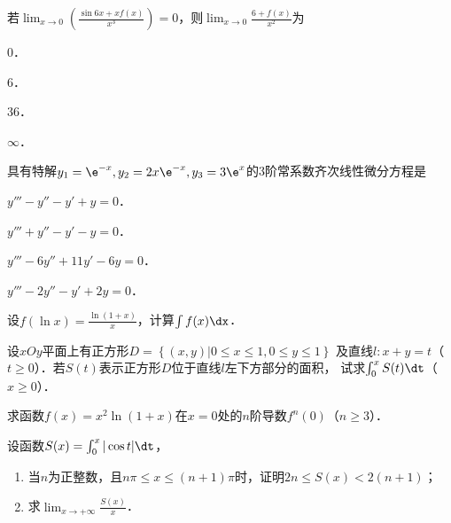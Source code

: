 \documentclass[plain,noanswer,medmath]{../../template/jnuexam}
\begin{document}


\begin{problem}
若$\lim_{x \to 0} \left(\frac{\sin 6x + xf(x)}{x^3} \right) = 0$，则$\lim_{x \to 0} \frac{6 + f(x)}{x^2}$为\pickout{}
\begin{abcd}
\item $0$．
\item $6$．
\item $36$．
\item $\infty$．
\end{abcd}
\end{problem}


\begin{problem}
具有特解$y_1 = \e^{- x},y_2 = 2x\e^{- x},y_3 = 3\e^x$的3阶常系数齐次线性微分方程是\pickout{}
\begin{abcd}
\item $y''' - y'' - y' + y = 0$．
\item $y''' + y'' - y' - y = 0$．
\item $y''' - 6y'' + 11y' - 6y = 0$．
\item $y''' - 2y'' - y' + 2y = 0$．
\end{abcd}
\end{problem}



\begin{problem}
设$f(\ln x) = \frac{\ln(1 + x)}{x}$，计算$\int f(x)\dx$．
\end{problem}



\begin{problem}
设$xOy$平面上有正方形$D = \left\{(x,y)\left| 0 \le x \le 1,0 \le y \le 1 \right. \right\}$
及直线$l:x + y = t$（$t \ge 0$）．若$S(t)$表示正方形$D$位于直线$l$左下方部分的面积，
试求$\int_0^x S(t)\dt$（$x \ge 0$）．
\end{problem}



\begin{problem}
求函数$f(x) = x^2\ln(1 + x)$在$x = 0$处的$n$阶导数$f^n(0)$（$n \ge 3$）．
\end{problem}



\begin{problem}
设函数$S(x) = \int_0^x |\cos t| \dt$，
\begin{enumerate}
\item 当$n$为正整数，且$n\pi \le x \le(n + 1)\pi$时，证明$2n \le S(x) < 2(n + 1)$；
\item 求$\lim_{x \to +\infty} \frac{S(x)}{x}$．
\end{enumerate}
\end{problem}
\end{document}
